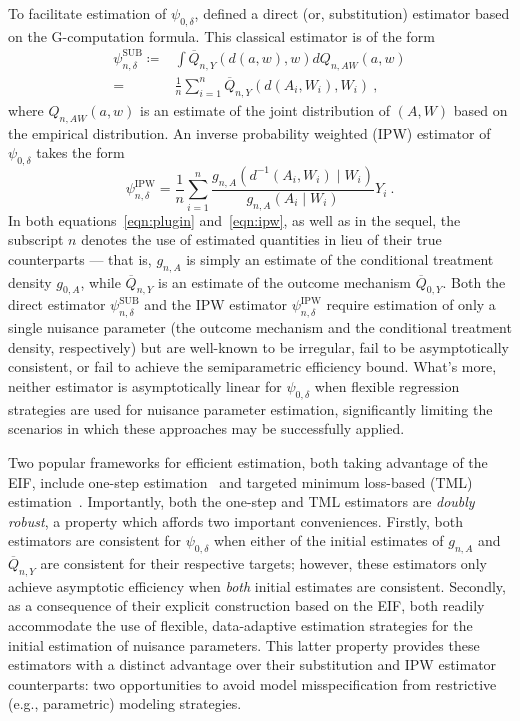 To facilitate estimation of $\psi_{0,\delta}$, \citet{diaz2018stochastic}
defined a direct (or, substitution) estimator based on the G-computation
formula. This classical estimator is of the form
\begin{align}\label{eqn:plugin}
  \psi_{n,\delta}^{\text{SUB}} \coloneqq&
      \int \overline{Q}_{n,Y}(d(a, w), w) dQ_{n,AW}(a,w) \nonumber \\
      =& \frac{1}{n} \sum_{i=1}^n \overline{Q}_{n,Y}(d(A_i, W_i), W_i)\ ,
\end{align}
where $Q_{n,AW}(a,w)$ is an estimate of the joint distribution of $(A,W)$ based
on the empirical distribution. An inverse probability weighted (IPW) estimator
of $\psi_{0,\delta}$ takes the form
\begin{equation}\label{eqn:ipw}
  \psi_{n,\delta}^{\text{IPW}} = \frac{1}{n} \sum_{i=1}^n \frac{g_{n, A}
    (d^{-1}(A_i, W_i) \mid W_i)}{g_{n, A}(A_i \mid W_i)} Y_i \ .
\end{equation}
In both equations~\ref{eqn:plugin} and~\ref{eqn:ipw}, as well as in the sequel,
the subscript $n$ denotes the use of estimated quantities in lieu of their true
counterparts --- that is, $g_{n,A}$ is simply an estimate of the conditional
treatment density $g_{0,A}$, while $\overline{Q}_{n,Y}$ is an estimate of the
outcome mechanism $\overline{Q}_{0,Y}$. Both the direct estimator
$\psi_{n,\delta}^{\text{SUB}}$ and the IPW estimator
$\psi_{n,\delta}^{\text{IPW}}$ require estimation of only a single nuisance
parameter (the outcome mechanism and the conditional treatment density,
respectively) but are well-known to be irregular, fail to be asymptotically
consistent, or fail to achieve the semiparametric efficiency bound. What's more,
neither estimator is asymptotically linear for $\psi_{0,\delta}$ when flexible
regression strategies are used for nuisance parameter estimation, significantly
limiting the scenarios in which these approaches may be successfully applied.

Two popular frameworks for efficient estimation, both taking advantage of the
EIF, include one-step
estimation~\citep{pfanzagl1985contributions,bickel1993efficient} and targeted
minimum loss-based (TML) estimation~\citep{vdl2006targeted, vdl2011targeted,
vdl2018targeted}. Importantly, both the one-step and TML estimators are
\textit{doubly robust}, a property which affords two important conveniences.
Firstly, both estimators are consistent for $\psi_{0,\delta}$ when either of the
initial estimates of $g_{n,A}$ and $\overline{Q}_{n,Y}$ are consistent for their
respective targets; however, these estimators only achieve asymptotic efficiency
when \textit{both} initial estimates are consistent. Secondly, as a consequence
of their explicit construction based on the EIF, both readily accommodate the
use of flexible, data-adaptive estimation strategies for the initial estimation
of nuisance parameters. This latter property provides these estimators with
a distinct advantage over their substitution and IPW estimator counterparts: two
opportunities to avoid model misspecification from restrictive (e.g.,
parametric) modeling strategies.

